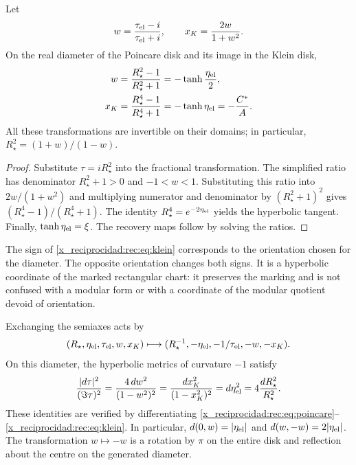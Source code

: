 \begin{theorem}
\label{x_reciprocidad:rec:thm:klein}
Let
\[
 w=\frac{\tau_{\rm el}-i}{\tau_{\rm el}+i},\qquad
 x_K=\frac{2w}{1+w^2}.
\]
On the real diameter of the Poincare disk and its image in the Klein disk,
\begin{align}
 w&=\frac{R_\star^2-1}{R_\star^2+1}
      =-\tanh\frac{\eta_{\rm el}}2,\label{x_reciprocidad:rec:eq:poincare}\\
 x_K&=\frac{R_\star^4-1}{R_\star^4+1}
      =-\tanh\eta_{\rm el}=-\frac{C^*}{A}.\label{x_reciprocidad:rec:eq:klein}
\end{align}
All these transformations are invertible on their domains; in particular,
\(R_\star^2=(1+w)/(1-w)\).
\end{theorem}
\begin{proof}
Substitute \(\tau=iR_\star^2\) into the fractional transformation. The simplified ratio has denominator \(R_\star^2+1>0\) and \(-1<w<1\). Substituting this ratio into \(2w/(1+w^2)\) and multiplying numerator and denominator by \((R_\star^2+1)^2\) gives \((R_\star^4-1)/(R_\star^4+1)\). The identity \(R_\star^4=e^{-2\eta_{\rm el}}\) yields the hyperbolic tangent. Finally, \(\tanh\eta_{\rm el}=\xi\). The recovery maps follow by solving the ratios.
\end{proof}

The sign of \eqref{x_reciprocidad:rec:eq:klein} corresponds to the orientation chosen for the diameter. The opposite orientation changes both signs. It is a hyperbolic coordinate of the marked rectangular chart: it preserves the marking and is not confused with a modular form or with a coordinate of the modular quotient devoid of orientation.

Exchanging the semiaxes acts by
\begin{equation}
 (R_\star,\eta_{\rm el},\tau_{\rm el},w,x_K)
 \longmapsto(R_\star^{-1},-\eta_{\rm el},-1/\tau_{\rm el},-w,-x_K).
 \label{x_reciprocidad:rec:eq:reciproco-radial}
\end{equation}
On this diameter, the hyperbolic metrics of curvature \(-1\) satisfy
\begin{equation}
 \frac{|d\tau|^2}{(\Im\tau)^2}
 =\frac{4\,dw^2}{(1-w^2)^2}
 =\frac{dx_K^2}{(1-x_K^2)^2}
 =d\eta_{\rm el}^2=4\frac{dR_\star^2}{R_\star^2}.
 \label{x_reciprocidad:rec:eq:metricas}
\end{equation}
These identities are verified by differentiating \eqref{x_reciprocidad:rec:eq:poincare}--\eqref{x_reciprocidad:rec:eq:klein}. In particular, \(d(0,w)=|\eta_{\rm el}|\) and \(d(w,-w)=2|\eta_{\rm el}|\). The transformation \(w\mapsto-w\) is a rotation by \(\pi\) on the entire disk and reflection about the centre on the generated diameter.

